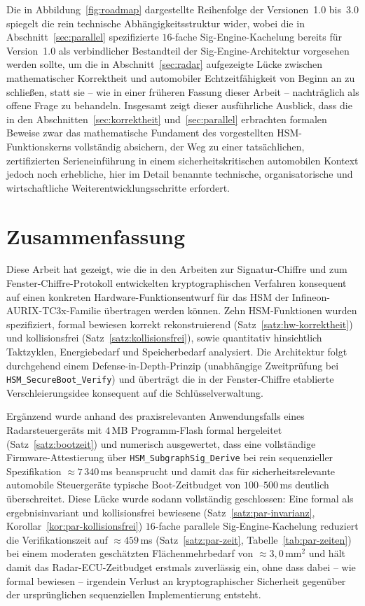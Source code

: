 ﻿\documentclass[a4paper,12pt]{article}
\theoremstyle{definition}
\begin{document}
Die in Abbildung~\ref{fig:roadmap} dargestellte Reihenfolge der Versionen~1.0 bis~3.0 spiegelt die rein technische Abhängigkeitsstruktur wider, wobei die in Abschnitt~\ref{sec:parallel} spezifizierte $16$-fache Sig-Engine-Kachelung bereits für Version~1.0 als verbindlicher Bestandteil der Sig-Engine-Architektur vorgesehen werden sollte, um die in Abschnitt~\ref{sec:radar} aufgezeigte Lücke zwischen mathematischer Korrektheit und automobiler Echtzeitfähigkeit von Beginn an zu schließen, statt sie -- wie in einer früheren Fassung dieser Arbeit -- nachträglich als offene Frage zu behandeln. Insgesamt zeigt dieser ausführliche Ausblick, dass die in den Abschnitten~\ref{sec:korrektheit} und~\ref{sec:parallel} erbrachten formalen Beweise zwar das mathematische Fundament des vorgestellten HSM-Funktionskerns vollständig absichern, der Weg zu einer tatsächlichen, zertifizierten Serieneinführung in einem sicherheitskritischen automobilen Kontext jedoch noch erhebliche, hier im Detail benannte technische, organisatorische und wirtschaftliche Weiterentwicklungsschritte erfordert.

\section{Zusammenfassung}

Diese Arbeit hat gezeigt, wie die in den Arbeiten zur Signatur-Chiffre \cite{Epp26b} und zum Fenster-Chiffre-Protokoll \cite{Epp26c} entwickelten kryptographischen Verfahren konsequent auf einen konkreten Hardware-Funktionsentwurf für das HSM der Infineon-AURIX-TC3x-Familie übertragen werden können. Zehn HSM-Funktionen wurden spezifiziert, formal bewiesen korrekt rekonstruierend (Satz~\ref{satz:hw-korrektheit}) und kollisionsfrei (Satz~\ref{satz:kollisionsfrei}), sowie quantitativ hinsichtlich Taktzyklen, Energiebedarf und Speicherbedarf analysiert. Die Architektur folgt durchgehend einem Defense-in-Depth-Prinzip (unabhängige Zweitprüfung bei \texttt{HSM\_SecureBoot\_Verify}) und überträgt die in der Fenster-Chiffre etablierte Verschleierungsidee konsequent auf die Schlüsselverwaltung.

Ergänzend wurde anhand des praxisrelevanten Anwendungsfalls eines Radarsteuergeräts mit $4$\,MB Programm-Flash formal hergeleitet (Satz~\ref{satz:bootzeit}) und numerisch ausgewertet, dass eine vollständige Firmware-Attestierung über \texttt{HSM\_SubgraphSig\_Derive} bei rein sequenzieller Spezifikation $\approx 7\,340$\,ms beansprucht und damit das für sicherheitsrelevante automobile Steuergeräte typische Boot-Zeitbudget von $100$--$500$\,ms deutlich überschreitet. Diese Lücke wurde sodann vollständig geschlossen: Eine formal als ergebnisinvariant und kollisionsfrei bewiesene (Satz~\ref{satz:par-invarianz}, Korollar~\ref{kor:par-kollisionsfrei}) $16$-fache parallele Sig-Engine-Kachelung reduziert die Verifikationszeit auf $\approx 459$\,ms (Satz~\ref{satz:par-zeit}, Tabelle~\ref{tab:par-zeiten}) bei einem moderaten geschätzten Flächenmehrbedarf von $\approx 3{,}0\,\mathrm{mm}^2$ und hält damit das Radar-ECU-Zeitbudget erstmals zuverlässig ein, ohne dass dabei -- wie formal bewiesen -- irgendein Verlust an kryptographischer Sicherheit gegenüber der ursprünglichen sequenziellen Implementierung entsteht.
\end{document}
